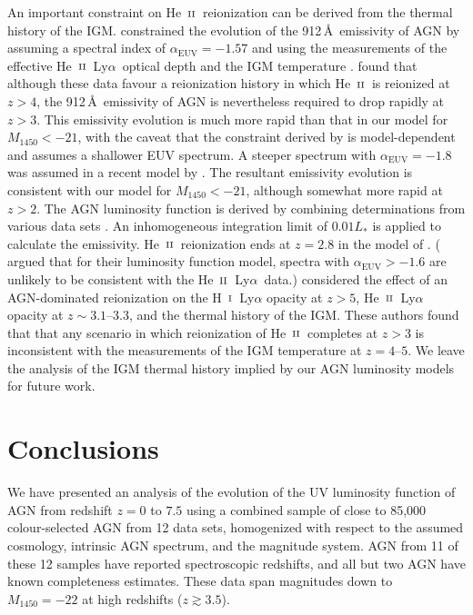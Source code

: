 \documentclass[fleqn,usenatbib]{mnras}
\def\lya{Ly$\alpha$~}
\def\HI{\hbox{H~$\scriptstyle\rm I$}}
\def\HeII{\hbox{He~$\scriptstyle\rm II$}}
\begin{document}
An important constraint on \HeII\ reionization can be derived from the
thermal history of the IGM.  \citet{2018MNRAS.473.1416M} constrained
the evolution of the 912\,\AA\ emissivity of AGN by assuming a
spectral index of $\alpha_\mathrm{EUV}=-1.57$ and using the
measurements of the effective \HeII\ \lya optical depth
\citep{2016ApJ...825..144W} and the IGM temperature
\citep{2011MNRAS.410.1096B}.  \citet{2018MNRAS.473.1416M} found that
although these data favour a reionization history in which \HeII\ is
reionized at $z>4$, the 912\,\AA\ emissivity of AGN is nevertheless
required to drop rapidly at $z>3$.  This emissivity evolution is much
more rapid than that in our model for $M_\mathrm{1450}<-21$, with the
caveat that the constraint derived by \citet{2018MNRAS.473.1416M} is
model-dependent and assumes a shallower EUV spectrum.  A steeper
spectrum with $\alpha_\mathrm{EUV}=-1.8$ was assumed in a recent model
by \citet{2018arXiv180109693K}.  The resultant emissivity evolution is
consistent with our model for $M_\mathrm{1450}<-21$, although somewhat
more rapid at $z>2$.  The AGN luminosity function is derived by
combining determinations from various data sets
\citep{2015MNRAS.451L..30K}.  An inhomogeneous integration limit of
$0.01L_*$ is applied to calculate the emissivity.  \HeII\ reionization
ends at $z=2.8$ in the model of \citet{2018arXiv180109693K}.
(\citealt{2017MNRAS.471..255K} argued that for their luminosity
function model, spectra with $\alpha_\mathrm{EUV}>-1.6$ are unlikely
to be consistent with the \HeII\ \lya data.)
\citet{2017MNRAS.468.4691D} considered the effect of an AGN-dominated
reionization on the \HI\ Ly$\alpha$ opacity at $z>5$,
\HeII\ Ly$\alpha$ opacity at $z\sim 3.1$--$3.3$, and the thermal
history of the IGM.  These authors found that that any scenario in
which reionization of \HeII\ completes at $z>3$ is inconsistent with
the measurements of the IGM temperature at $z=4$--$5$.  We leave the
analysis of the IGM thermal history implied by our AGN luminosity
models for future work.

\section{Conclusions}
\label{sec:conc}

We have presented an analysis of the evolution of the UV luminosity
function of AGN from redshift $z=0$ to $7.5$ using a combined sample
of close to 85,000 colour-selected AGN from 12 data sets, homogenized
with respect to the assumed cosmology, intrinsic AGN spectrum, and the
magnitude system.  AGN from 11 of these 12 samples have reported
spectroscopic redshifts, and all but two AGN have known completeness
estimates.  These data span magnitudes down to $M_{1450}=-22$ at high
redshifts ($z\gtrsim 3.5$).
\end{document}
